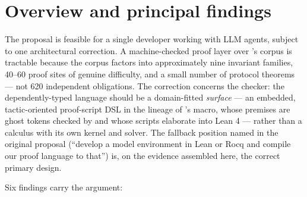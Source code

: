\section{Overview and principal findings}
\label{sec:verdict}

\begin{verdictbox}
The proposal is feasible for a single developer working with
LLM agents, subject to one architectural correction. A machine-checked
proof layer over \dotnetrs{}'s \safetyc{} corpus is tractable because
the corpus factors into approximately nine invariant families,
40--60 proof sites of genuine difficulty, and a small number of
protocol theorems --- not 620 independent obligations. The correction
concerns the checker: the dependently-typed language should be a
domain-fitted \emph{surface} --- an embedded, tactic-oriented
proof-script DSL in the lineage of 's 
macro, whose premises are ghost tokens checked by  and
whose scripts elaborate into Lean 4 --- rather than a calculus with its
own kernel and solver. The fallback position named in the original
proposal (``develop a model environment in Lean or Rocq and compile
our proof language to that'') is, on the evidence assembled here, the
correct primary design.
\end{verdictbox}

Six findings carry the argument:

